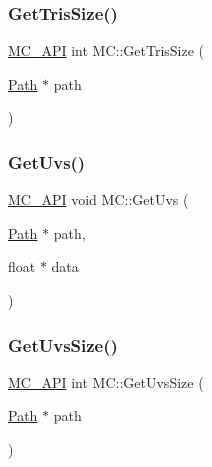 \mbox{\label{namespace_m_c_a31d92d2139692e2eff5847ef34832826}} 
\subsubsection{\texorpdfstring{GetTrisSize()}{GetTrisSize()}}
{\footnotesize\ttfamily \mbox{\hyperlink{_mesh___creator___controller_8hpp_a529916b90fdb2765a7b955fded854b0a}{M\+C\+\_\+\+A\+PI}} int M\+C\+::\+Get\+Tris\+Size (\begin{DoxyParamCaption}\item[{\mbox{\hyperlink{class_m_c_1_1_path}{Path}} $\ast$}]{path }\end{DoxyParamCaption})}

\mbox{\label{namespace_m_c_a539fd0bf94fb0e35eecbb219670904a5}} 
\subsubsection{\texorpdfstring{GetUvs()}{GetUvs()}}
{\footnotesize\ttfamily \mbox{\hyperlink{_mesh___creator___controller_8hpp_a529916b90fdb2765a7b955fded854b0a}{M\+C\+\_\+\+A\+PI}} void M\+C\+::\+Get\+Uvs (\begin{DoxyParamCaption}\item[{\mbox{\hyperlink{class_m_c_1_1_path}{Path}} $\ast$}]{path,  }\item[{float $\ast$}]{data }\end{DoxyParamCaption})}

\mbox{\label{namespace_m_c_aee2106bde63b01f674a0e7546e3f91cf}} 
\subsubsection{\texorpdfstring{GetUvsSize()}{GetUvsSize()}}
{\footnotesize\ttfamily \mbox{\hyperlink{_mesh___creator___controller_8hpp_a529916b90fdb2765a7b955fded854b0a}{M\+C\+\_\+\+A\+PI}} int M\+C\+::\+Get\+Uvs\+Size (\begin{DoxyParamCaption}\item[{\mbox{\hyperlink{class_m_c_1_1_path}{Path}} $\ast$}]{path }\end{DoxyParamCaption})}

